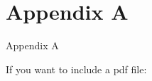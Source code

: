 \documentclass{Configuration_Files/PoliMi3i_thesis}
\begin{document}
\mainmatter %


















\cleardoublepage
{} %
\chapter*{Appendix A}
\label{chapter:Appendix A}
Appendix A

If you want to include a pdf file:
%


\cleardoublepage

%
\end{document}
